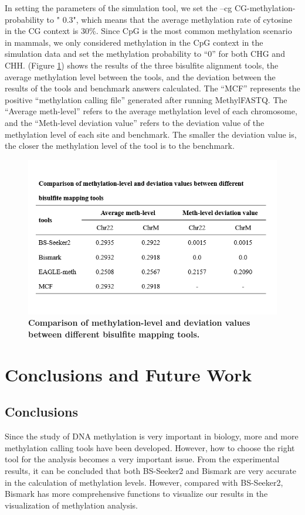 \documentclass{PHlab-thesis}
\begin{document}
\par
In setting the parameters of the simulation tool, we set the --cg CG-methylation-probability to " 0.3", which means that the average methylation rate of cytosine in the CG context is 30\%. Since CpG is the most common methylation scenario in mammals, we only considered methylation in the CpG context in the simulation data and set the methylation probability to “0” for both CHG and CHH. (Figure \ref{f14}) shows the results of the three bisulfite alignment tools, the average methylation level between the tools, and the deviation between the results of the tools and benchmark answers calculated. The “MCF” represents the positive “methylation calling file” generated after running MethylFASTQ. The “Average meth-level” refers to the average methylation level of each chromosome, and the “Meth-level deviation value” refers to the deviation value of the methylation level of each site and benchmark. The smaller the deviation value is, the closer the methylation level of the tool is to the benchmark.

\begin{figure}[h]
  \centering
  \includegraphics[scale=1.0]{table/table7.png}
  \caption{\textbf{Comparison of methylation-level and deviation values between different bisulfite mapping tools.}}
  \label{f14}
\end{figure}


\chapter{Conclusions and Future Work}

\section{Conclusions}
Since the study of DNA methylation is very important in biology, more and more methylation calling tools have been developed. However, how to choose the right tool for the analysis becomes a very important issue. From the experimental results, it can be concluded that both BS-Seeker2 and Bismark are very accurate in the calculation of methylation levels. However, compared with BS-Seeker2, Bismark has more comprehensive functions to visualize our results in the visualization of methylation analysis.
\end{document}
